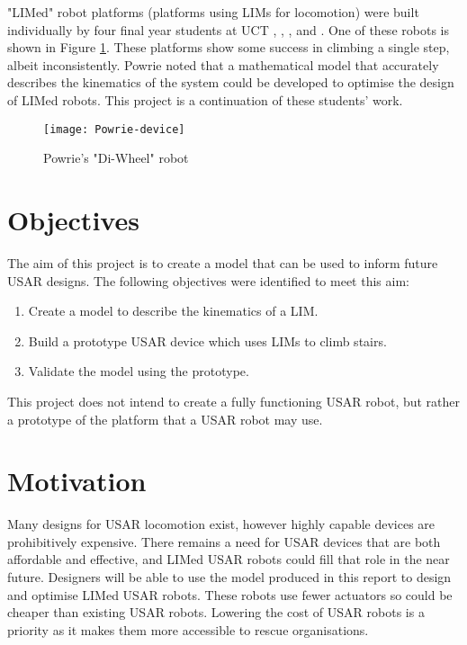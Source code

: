 \noindent "LIMed" robot platforms (platforms using LIMs for locomotion) were built individually by four final year students at UCT \citep{Wilson-2013},  \citep{Haskel-2017}, \citep{Buchanan-2018}, and \citep{Powrie-2019}. One of these robots is shown in Figure \ref{Powrie robot}. These platforms show some success in climbing a single step, albeit inconsistently. Powrie noted that a mathematical model that accurately describes the kinematics of the system could be developed to optimise the design of LIMed robots. This project is a continuation of these students' work.


\begin{figure}[h]
	\centering
	\texttt{[image: Powrie-device]}
	\caption{Powrie's "Di-Wheel" robot \citep{Powrie-2019}}
	\label{Powrie robot}
\end{figure}

\section{Objectives}
The aim of this project is to create a model that can be used to inform future USAR designs.
The following objectives were identified to meet this aim:
\begin{enumerate}
	\item Create a model to describe the kinematics of a LIM.
	\item Build a prototype USAR device which uses LIMs to climb stairs.
	\item Validate the model using the prototype.
\end{enumerate}
This project does not intend to create a fully functioning USAR robot, but rather a prototype of the platform that a USAR robot may use.
\section{Motivation}

Many designs for USAR locomotion exist, however highly capable devices are prohibitively expensive. There remains a need for USAR devices that are both affordable and effective, and LIMed USAR robots could fill that role in the near future. Designers will be able to use the model produced in this report to design and optimise LIMed USAR robots. These robots use fewer actuators so could be cheaper than existing USAR robots. Lowering the cost of USAR robots is a priority as it makes them more accessible to rescue organisations.